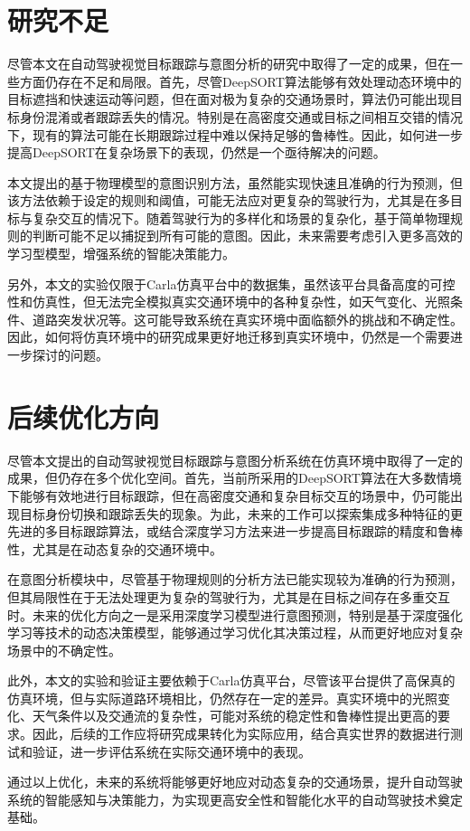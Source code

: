 \section{研究不足}

尽管本文在自动驾驶视觉目标跟踪与意图分析的研究中取得了一定的成果，但在一些方面仍存在不足和局限。首先，尽管DeepSORT算法能够有效处理动态环境中的目标遮挡和快速运动等问题，但在面对极为复杂的交通场景时，算法仍可能出现目标身份混淆或者跟踪丢失的情况。特别是在高密度交通或目标之间相互交错的情况下，现有的算法可能在长期跟踪过程中难以保持足够的鲁棒性。因此，如何进一步提高DeepSORT在复杂场景下的表现，仍然是一个亟待解决的问题。

本文提出的基于物理模型的意图识别方法，虽然能实现快速且准确的行为预测，但该方法依赖于设定的规则和阈值，可能无法应对更复杂的驾驶行为，尤其是在多目标与复杂交互的情况下。随着驾驶行为的多样化和场景的复杂化，基于简单物理规则的判断可能不足以捕捉到所有可能的意图。因此，未来需要考虑引入更多高效的学习型模型，增强系统的智能决策能力。

另外，本文的实验仅限于Carla仿真平台中的数据集，虽然该平台具备高度的可控性和仿真性，但无法完全模拟真实交通环境中的各种复杂性，如天气变化、光照条件、道路突发状况等。这可能导致系统在真实环境中面临额外的挑战和不确定性。因此，如何将仿真环境中的研究成果更好地迁移到真实环境中，仍然是一个需要进一步探讨的问题。


\section{后续优化方向}

尽管本文提出的自动驾驶视觉目标跟踪与意图分析系统在仿真环境中取得了一定的成果，但仍存在多个优化空间。首先，当前所采用的DeepSORT算法在大多数情境下能够有效地进行目标跟踪，但在高密度交通和复杂目标交互的场景中，仍可能出现目标身份切换和跟踪丢失的现象。为此，未来的工作可以探索集成多种特征的更先进的多目标跟踪算法，或结合深度学习方法来进一步提高目标跟踪的精度和鲁棒性，尤其是在动态复杂的交通环境中。

在意图分析模块中，尽管基于物理规则的分析方法已能实现较为准确的行为预测，但其局限性在于无法处理更为复杂的驾驶行为，尤其是在目标之间存在多重交互时。未来的优化方向之一是采用深度学习模型进行意图预测，特别是基于深度强化学习等技术的动态决策模型，能够通过学习优化其决策过程，从而更好地应对复杂场景中的不确定性。

此外，本文的实验和验证主要依赖于Carla仿真平台，尽管该平台提供了高保真的仿真环境，但与实际道路环境相比，仍然存在一定的差异。真实环境中的光照变化、天气条件以及交通流的复杂性，可能对系统的稳定性和鲁棒性提出更高的要求。因此，后续的工作应将研究成果转化为实际应用，结合真实世界的数据进行测试和验证，进一步评估系统在实际交通环境中的表现。

通过以上优化，未来的系统将能够更好地应对动态复杂的交通场景，提升自动驾驶系统的智能感知与决策能力，为实现更高安全性和智能化水平的自动驾驶技术奠定基础。



\begin{tabular}{l l}
\end{tabular}

